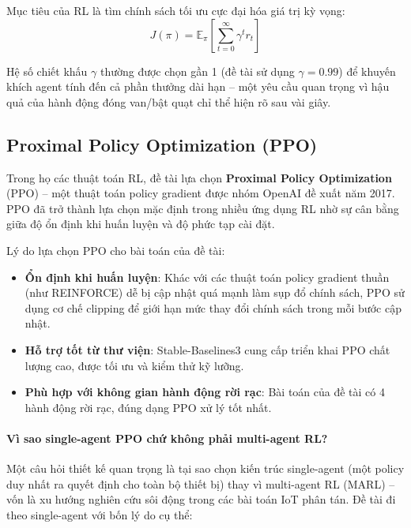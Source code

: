 Mục tiêu của RL là tìm chính sách tối ưu cực đại hóa giá trị kỳ vọng:
\begin{equation}
  J(\pi) = \mathbb{E}_\pi \left[ \sum_{t=0}^{\infty} \gamma^t r_t \right]
\end{equation}

Hệ số chiết khấu $\gamma$ thường được chọn gần 1 (đề tài sử dụng $\gamma = 0.99$) để khuyến khích agent tính đến cả phần thưởng dài hạn – một yêu cầu quan trọng vì hậu quả của hành động đóng van/bật quạt chỉ thể hiện rõ sau vài giây.

\subsection{Proximal Policy Optimization (PPO)}

Trong họ các thuật toán RL, đề tài lựa chọn \textbf{Proximal Policy Optimization} (PPO) \cite{schulman2017} – một thuật toán policy gradient được nhóm OpenAI đề xuất năm 2017. PPO đã trở thành lựa chọn mặc định trong nhiều ứng dụng RL nhờ sự cân bằng giữa độ ổn định khi huấn luyện và độ phức tạp cài đặt.

Lý do lựa chọn PPO cho bài toán của đề tài:
\begin{itemize}
  \item \textbf{Ổn định khi huấn luyện}: Khác với các thuật toán policy gradient thuần (như REINFORCE) dễ bị cập nhật quá mạnh làm sụp đổ chính sách, PPO sử dụng cơ chế clipping để giới hạn mức thay đổi chính sách trong mỗi bước cập nhật.
  \item \textbf{Hỗ trợ tốt từ thư viện}: Stable-Baselines3 \cite{raffin2021} cung cấp triển khai PPO chất lượng cao, được tối ưu và kiểm thử kỹ lưỡng.
  \item \textbf{Phù hợp với không gian hành động rời rạc}: Bài toán của đề tài có 4 hành động rời rạc, đúng dạng PPO xử lý tốt nhất.
\end{itemize}

\paragraph{Vì sao single-agent PPO chứ không phải multi-agent RL?}
Một câu hỏi thiết kế quan trọng là tại sao chọn kiến trúc single-agent (một policy duy nhất ra quyết định cho toàn bộ thiết bị) thay vì multi-agent RL (MARL) -- vốn là xu hướng nghiên cứu sôi động trong các bài toán IoT phân tán. Đề tài đi theo single-agent với bốn lý do cụ thể:

